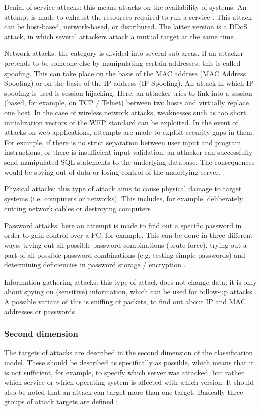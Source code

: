 \documentclass[conference]{IEEEtran}
\begin{document}
\smallskip Denial of service attacks: this means attacks on the availability of systems.  An attempt is made to exhaust the resources required to run a service \cite{b6}. This attack can be host-based, network-based, or distributed. The latter version is a DDoS attack, in which several attackers attack a mutual target at the same time \cite{b2}.

\smallskip Network attacks: the category is divided into several sub-areas. If an attacker pretends to be someone else by manipulating certain addresses, this is called spoofing. This can take place on the basis of the MAC address (MAC Address Spoofing) or on the basis of the IP address (IP Spoofing). An attack in which IP spoofing is used is session hijacking. Here, an attacker tries to link into a session (based, for example, on TCP / Telnet) between two hosts and virtually replace one host. In the case of wireless network attacks, weaknesses such as too short initialization vectors of the WEP standard can be exploited. In the event of attacks on web applications, attempts are made to exploit security gaps in them.  For example, if there is no strict separation between user input and program instructions, or there is insufficient input validation, an attacker can successfully send manipulated SQL statements to the underlying database. The consequences would be spying out of data or losing control of the underlying server. \cite{b2}.

\smallskip Physical attacks: this type of attack aims to cause physical damage to target systems (i.e. computers or networks). This includes, for example, deliberately cutting network cables or destroying computers \cite{b2}.

\smallskip Password attacks: here an attempt is made to find out a specific password in order to gain control over a PC, for example. This can be done in three different ways: trying out all possible password combinations (brute force), trying out a part of all possible password combinations (e.g. testing simple passwords) and determining deficiencies in password storage / encryption \cite{b2,b5}.

\smallskip Information gathering attacks: this type of attack does not change data; it is only about spying on (sensitive) information, which can be used for follow-up attacks \cite{b5}. A possible variant of this is sniffing of packets, to find out about IP and MAC addresses or passwords \cite{b2}.

\medskip \subsubsection{Second dimension}The targets of attacks are described in the second dimension of the classification model. These should be described as specifically as possible, which means that it is not sufficient, for example, to specify which server was attacked, but rather which service or which operating system is affected with which version. It should also be noted that an attack can target more than one target. Basically three groups of attack targets are defined \cite{b5}:
\end{document}
